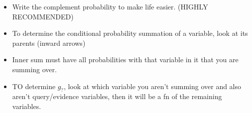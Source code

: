 \begin{warning}
    \begin{itemize}
        \item Write the complement probability to make life easier. (HIGHLY RECOMMENDED)
        \item To determine the conditional probability summation of a variable, look at its parents (inward arrows)
        \item Inner sum must have all probabilities with that variable in it that you are summing over. 
        \item TO determine $g_?$, look at which variable you aren't summing over and also aren't query/evidence variables, then it will be a fn of the remaining variables.
    \end{itemize}
\end{warning}
\newpage

